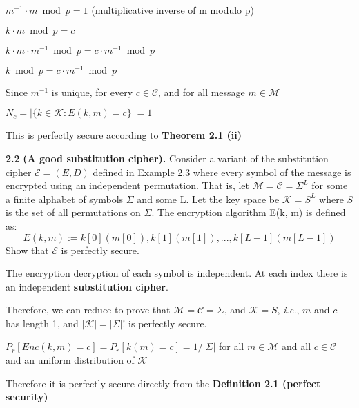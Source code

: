 \begin{tcolorbox}[solutionbox, title=Answer: Perfectly Secure]
    $m^{-1} \cdot m \bmod p = 1$ (multiplicative inverse of m modulo p)
    \vspace{1em}

    $k \cdot m \bmod p = c$

    $k \cdot m \cdot m^{-1} \bmod p = c \cdot m^{-1} \bmod p$

    $k \bmod p = c \cdot m^{-1} \bmod p$

    Since $m^{-1}$ is unique, for every $c \in \mathcal{C}$, and for all message $m \in \mathcal{M}$

    $N_c = |\{k \in \mathcal{K}: E(k,m) = c\}| = 1$

    This is perfectly secure according to \textbf{Theorem 2.1 (ii)}
\end{tcolorbox}

\newpage
\noindent
\textbf{2.2}
\textbf{(A good substitution cipher).} Consider a variant of the substitution cipher $\mathcal{E} = (E, D)$
defined in Example 2.3 where every symbol of the message is encrypted using an independent
permutation. That is, let $\mathcal{M} = \mathcal{C} = \Sigma^L$  for some a finite alphabet of symbols $\Sigma$ and some L. Let
the key space be $\mathcal{K} = S^L$ where $S$ is the set of all permutations on $\Sigma$. The encryption algorithm
E(k, m) is defined as:
\[
E(k, m) := k[0](m[0]), k[1](m[1]), . . . , k[L-1](m[L-1])
\]
Show that $\mathcal{E}$ is perfectly secure.


\begin{tcolorbox}[solutionbox, title=Answer]
    The encryption decryption of each symbol is independent. At each index there is an independent \textbf{substitution cipher}.
    \vspace{1em}

    Therefore, we can reduce to prove that $\mathcal{M} = \mathcal{C} = \Sigma$, and $\mathcal{K} = S$, \textit{i.e.}, $m$ and $c$ has length 1, and $|\mathcal{K}| = |\Sigma|!$ is perfectly secure.
    \vspace{1em}

    $P_r[Enc(k, m) = c] = P_r[k(m) = c] = 1/|\Sigma|$ for all $m \in \mathcal{M}$ and all $c \in \mathcal{C}$ and an uniform distribution of $\mathcal{K}$
    \vspace{1em}

    Therefore it is perfectly secure directly from the \textbf{Definition 2.1 (perfect security)} 

\end{tcolorbox}



